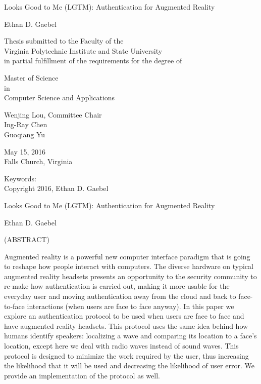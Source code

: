 \documentclass[12pt]{report}
\begin{document}
\thispagestyle{empty}
\begin{center}

{\Large 
Looks Good to Me (LGTM): 
Authentication for Augmented Reality
}

\vfill

Ethan D. Gaebel

\vfill

Thesis submitted to the Faculty of the \\
Virginia Polytechnic Institute and State University \\
in partial fulfillment of the requirements for the degree of

\vfill

Master of Science \\
in \\
Computer Science and Applications

\vfill

Wenjing Lou, Committee Chair \\
Ing-Ray Chen \\
Guoqiang Yu 

\vfill

May 15, 2016 \\
Falls Church, Virginia

\vfill

Keywords: 
\\
Copyright 2016, Ethan D. Gaebel

\end{center}

\pagebreak

\thispagestyle{empty}
\begin{center}

{\large Looks Good to Me (LGTM): 
Authentication for Augmented Reality}

\vfill

Ethan D. Gaebel

\vfill

(ABSTRACT)

Augmented reality is a powerful new computer interface paradigm that is going to reshape how people interact with computers. The diverse hardware on typical augmented reality headsets presents an opportunity to the security community to re-make how authentication is carried out, making it more usable for the everyday user and moving authentication away from the cloud and back to face-to-face interactions (when users are face to face anyway). In this paper we explore an authentication protocol to be used when users are face to face and have augmented reality headsets. This protocol uses the same idea behind how humans identify speakers: localizing a wave and comparing its location to a face's location, except here we deal with radio waves instead of sound waves. This protocol is designed to minimize the work required by the user, thus increasing the likelihood that it will be used and decreasing the likelihood of user error. We provide an implementation of the protocol as well.

\vfill

\end{center}
\end{document}
